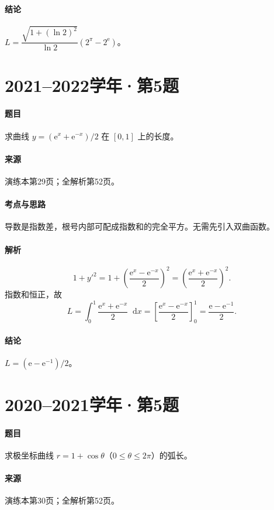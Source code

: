 \documentclass[UTF8,fontset=fandol,12pt,oneside,openany]{ctexrep}
\newcommand{\dd}{\mathop{}\!\mathrm d}
\newcommand{\ee}{\mathrm e}
\theoremstyle{definition}
\begin{document}
\paragraph{结论}$L=\dfrac{\sqrt{1+(\ln2)^2}}{\ln2}(2^\pi-2^\ee)$。

\par\addvspace{18pt}\noindent\begin{minipage}{\linewidth}
\section{2021--2022学年·第5题}
\paragraph{题目}求曲线 $y=(\ee^x+\ee^{-x})/2$ 在 $[0,1]$ 上的长度。
\paragraph{来源}演练本第29页；全解析第52页。
\end{minipage}\par
\paragraph{考点与思路}导数是指数差，根号内部可配成指数和的完全平方。无需先引入双曲函数。
\paragraph{解析}
\[
 1+y'^2=1+\left(\frac{\ee^x-\ee^{-x}}2\right)^2
 =\left(\frac{\ee^x+\ee^{-x}}2\right)^2.
\]
指数和恒正，故
\[
 L=\int_0^1\frac{\ee^x+\ee^{-x}}2\dd x
 =\left[\frac{\ee^x-\ee^{-x}}2\right]_0^1
 =\frac{\ee-\ee^{-1}}2.
\]
\paragraph{结论}$L=(\ee-\ee^{-1})/2$。

\par\addvspace{18pt}\noindent\begin{minipage}{\linewidth}
\section{2020--2021学年·第5题}
\paragraph{题目}求极坐标曲线 $r=1+\cos\theta$（$0\le\theta\le2\pi$）的弧长。
\paragraph{来源}演练本第30页；全解析第52页。
\end{minipage}\par
\end{document}
